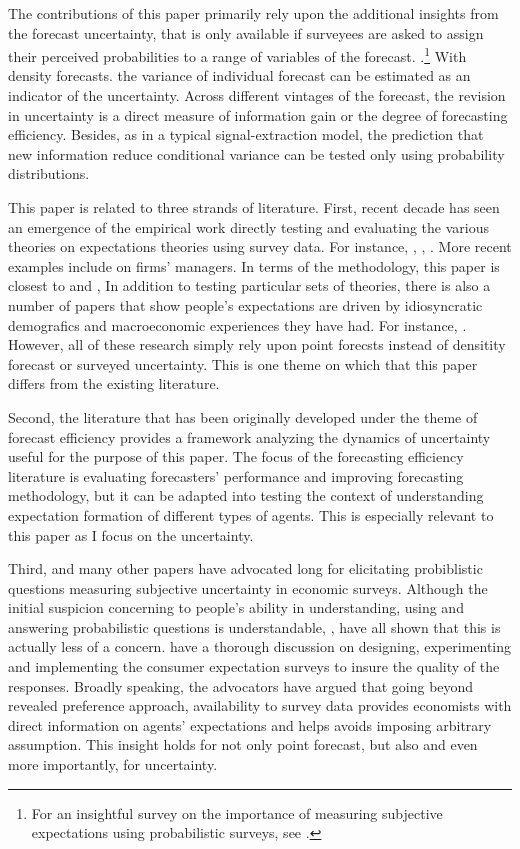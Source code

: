 \documentclass[]{article}
\begin{document}
	The contributions of this paper primarily rely upon the additional insights from the forecast uncertainty, that is only available if surveyees are asked to assign their perceived probabilities to a range of variables of the forecast. .\footnote{For an insightful survey on the importance of measuring subjective expectations using probabilistic surveys, see \citet{manski2004measuring}.} With density forecasts. the variance of individual forecast can be estimated as an indicator of the uncertainty. Across different vintages of the forecast, the revision in uncertainty is a direct measure of  information gain or the degree of forecasting efficiency. Besides, as in a typical signal-extraction model, the prediction that new information reduce conditional variance can be tested only using probability distributions.   
	
	This paper is related to three strands of literature. First, recent decade has seen an emergence of the empirical work directly testing and evaluating the various theories on expectations theories using survey data. For instance, \citet{mankiw2003disagreement}, \citet{carroll2003macroeconomic}, \citet{branch2004theory}. More recent examples include \citet{coibion2018firms} on firms' managers. In terms of the methodology, this paper is closest to \citet{coibion2012can} and \citet{fuhrer2018intrinsic}, In addition to testing particular sets of theories, there is also a number of papers that show people's expectations are driven by idiosyncratic demografics and macroeconomic experiences they have had. For instance, \citet{malmendier2015learning}. However, all of these research simply rely upon point forecsts instead of densitity forecast or surveyed uncertainty. This is one theme on which that this paper differs from the existing literature.   
	
	Second, the literature that has been originally developed under the theme of forecast efficiency provides a framework analyzing the dynamics of uncertainty useful for the purpose of this paper. The focus of the forecasting efficiency literature is evaluating forecasters' performance and improving forecasting methodology, but it can be adapted into testing the context of understanding expectation formation of different types of agents. This is especially relevant to this paper as I focus on the uncertainty. 
	
	Third, \citet{manski2004measuring} and many other papers have advocated long for elicitating probiblistic questions measuring subjective uncertainty in economic surveys. Although the initial suspicion concerning to people's ability in understanding, using and answering probabilistic questions is understandable, \citet{xx}, \citet{xx} have all shown that this is actually less of a concern. \citet{armantier2017overview} have a thorough discussion on designing, experimenting and implementing the consumer expectation surveys to insure the quality of the responses. Broadly speaking, the advocators have argued that going beyond revealed preference approach, availability to survey data provides economists with direct information on agents' expectations and helps avoids imposing arbitrary assumption.  This insight holds for not only point forecast, but also and even more importantly, for uncertainty.
	
\end{document}
